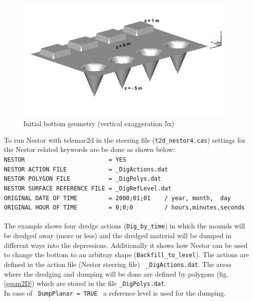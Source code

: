 \begin{figure} [H]
 \centering
 \includegraphics[scale=0.15]{img/Bild_BottomGeometrie_3D.png}
 \caption{Initial bottom geometry (vertical exaggeration 5x)}
 \label{geom3D}
\end{figure}

To run Nestor with telemac2d in the steering file (\texttt{t2d\_nestor4.cas})
settings for the Nestor related keywords are be done as shown below:
\\ \texttt{\small{NESTOR~~~~~~~~~~~~~~~~~~~~~~~~= YES}}
\\ \texttt{\small{NESTOR ACTION FILE~~~~~~~~~~~~= \_DigActions.dat}}
\\ \texttt{\small{NESTOR POLYGON FILE~~~~~~~~~~~= \_DigPolys.dat}}
\\ \texttt{\small{NESTOR SURFACE REFERENCE FILE~= \_DigRefLevel.dat}}
\\ \texttt{\small{ORIGINAL DATE OF TIME~~~~~~~~~= 2000;01;01~~~~/ year,~month,~~day}}
\\ \texttt{\small{ORIGINAL HOUR OF TIME~~~~~~~~~= 0;0;0~~~~~~~~~/ hours,minutes,seconds}} \\
\\
The example shows four dredge actions (\texttt{Dig\_by\_time}) in which the
mounds will be dredged away (more or less) and the dredged material
will be dumped in different ways into the depressions.
Additionally it shows how Nestor can be used to change the bottom to an arbitray shape (\texttt{Backfill\_to\_level}).
The actions are defined in the action file (Nestor steering file) \texttt{~\_DigActions.dat}.
The areas where the dredging and dumping will be done are defined by polygons (fig.\,\ref{geom2D})
which are stored in the file \texttt{\_DigPolys.dat}.\\
In case of \texttt{~DumpPlanar\,=\,TRUE~} a reference level is used for the dumping.
\\
\newpage
